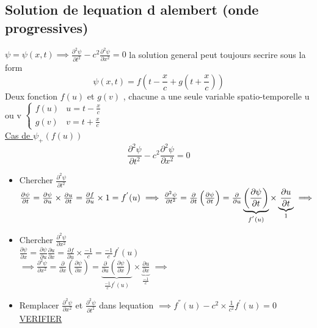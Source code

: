 \documentclass[12pt]{book}
\begin{document}
            \subsection{Solution de lequation d alembert (onde progressives)}
                $ \psi = \psi(x,t) \implies \frac{\partial^2 \psi }{\partial t^2}-c^2\frac{\partial^2 \psi }{\partial x^2} =0$ la solution general peut toujours secrire sous la form 
                $$  \psi(x,t) = f(t-\frac{x}{c}+g(t+\frac{x}{c })) $$
                Deux fonction $f(u)$ et $g(v)$ , chacune a une seule variable spatio-temporelle u ou v $\begin{cases}
                    f(u) & u = t-\frac{x}{c} \\ 
                    g(v) & v = t+\frac{x}{c}
                \end{cases}$\\
                \underline{Cas de $\psi_+ (f(u))$} \\
                    $$ \frac{\partial^2 \psi}{\partial t^2}-c^2 \frac{\partial^2\psi}{\partial x^2}=0 $$
                    \begin{itemize}
                        \item Chercher $\frac{\partial^2 \psi}{\partial t^2}$
                            $\frac{\partial \psi}{\partial t} = \frac{\partial \psi}{\partial u}\times\frac{\partial u}{\partial t}=\frac{\partial f}{\partial u}\times 1=f^{'}(u)\\
                             \implies \frac{\partial^2 \psi}{\partial t^2}=\frac{\partial}{\partial t}\left( \frac{\partial\psi}{\partial t} \right)=\frac{\partial}{\partial u}\underbrace{\left( \frac{\partial \psi}{\partial t} \right)}_{f^{'}(u)}\times\underbrace{\frac{\partial u}{\partial t}}_{1} \implies $
                        \item Chercher $\frac{\partial^2\psi}{\partial x^2}$ \\
                            $\frac{\partial\psi}{\partial x}  = \frac{\partial \psi}{\partial u}\frac{\partial u}{\partial x} = \frac{\partial f}{\partial u}\times\frac{-1}{c}=\frac{-1}{c}f^{'}(u)$\\
                            $\implies \frac{\partial^2 \psi}{\partial x^2}=\frac{\partial}{\partial x}\left( \frac{\partial\psi}{\partial x} \right)=\underbrace{\frac{\partial}{\partial u}\left( \frac{\partial \psi}{\partial x} \right)}_{\frac{-1}{c}f^{'}(u)}\times\underbrace{\frac{\partial u}{\partial x}}_{\frac{-1}{c}}$
                            $\implies  $
                        \item  Remplacer $\frac{\partial^2\psi}{\partial x^2}$ et $\frac{\partial^2\psi}{\partial t^2}$ dans lequation $\implies f^{''}(u)-c^2\times\frac{1}{c^2}f^{'}(u) = 0$ \underline{VERIFIER}
                    \end{itemize}
\end{document}
